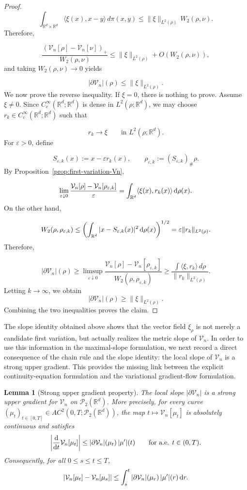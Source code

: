 \documentclass[11pt,reqno]{amsart}
\numberwithin{figure}{section}
\def\d {{\partial}}
\newcommand{\bbr}{\mathbb R}
\def\d{\mathrm{d}}
\newcommand{\dm}{d}
\renewcommand{\d}{  {\textup{d}} }
\newtheorem{lemma}{Lemma}[section]
\begin{document}
\begin{proof}
\[ \int_{\bbr^\dm\times\bbr^\dm} \langle \xi(x),x-y\rangle\,d\pi(x,y) \le \|\xi\|_{L^2(\rho)}\,W_2(\rho,\nu). \] 
Therefore, 

\[ \frac{(\mathcal V_n[\rho]-\mathcal V_n[\nu])_+}{W_2(\rho,\nu)} \le \|\xi\|_{L^2(\rho)}+O\!\left(W_2(\rho,\nu)\right), \] 
and taking $W_2(\rho,\nu)\to 0$ yields 

\[ |\partial \mathcal V_n|(\rho)\le \|\xi\|_{L^2(\rho)}. \] 
We now prove the reverse inequality. If $\xi=0$, there is nothing to prove. Assume $\xi\neq0$. Since $C_c^\infty(\mathbb R^d;\mathbb R^d)$ is dense in $L^2(\rho;\mathbb R^d)$, we may choose $r_k\in C_c^\infty(\mathbb R^d;\mathbb R^d)$ such that

\[ r_k\to \xi \qquad\text{in }L^2(\rho;\mathbb R^d). \] 
For $\varepsilon>0$, define 

\[ S_{\varepsilon,k}(x):=x-\varepsilon r_k(x), \qquad \rho_{\varepsilon,k}:=(S_{\varepsilon,k})_\#\rho. \] 
By Proposition~\ref{prop:first-variation-Vn}, 

\[ \lim_{\varepsilon\downarrow0} \frac{\mathcal V_n[\rho]-\mathcal V_n[\rho_{\varepsilon,k}]}{\varepsilon} = \int_{\mathbb R^d}\langle \xi(x),r_k(x)\rangle\,\d\rho(x). \] 
On the other hand, 

\[ W_2(\rho,\rho_{\varepsilon,k}) \le \left(\int_{\mathbb R^d}|x-S_{\varepsilon,k}(x)|^2\,\d\rho(x)\right)^{1/2} = \varepsilon \|r_k\|_{L^2(\rho)}. \] 
Therefore, 

\[ |\partial \mathcal V_n|(\rho) \ge \limsup_{\varepsilon\downarrow0} \frac{\mathcal V_n[\rho]-\mathcal V_n[\rho_{\varepsilon,k}]}{W_2(\rho,\rho_{\varepsilon,k})} \ge \frac{\int \langle \xi,r_k\rangle\,d\rho}{\|r_k\|_{L^2(\rho)}}. \] 
Letting $k\to\infty$, we obtain \[ |\partial \mathcal V_n|(\rho)\ge \|\xi\|_{L^2(\rho)}. \] 
Combining the two inequalities proves the claim. 

\end{proof} 

The slope identity obtained above shows that the vector field
$\xi_\rho$ is not merely a candidate first variation, but actually realizes
the metric slope of $\mathcal V_n$. In order to use this information in the
maximal-slope formulation, we next record a direct consequence of the chain
rule and the slope identity: the local slope of $\mathcal V_n$ is a strong
upper gradient. This provides the missing link between the explicit
continuity-equation formulation and the variational gradient-flow
formulation.

\begin{lemma}[Strong upper gradient property]
\label{lem:strong-upper-gradient-Vn}
The local slope $|\partial \mathcal V_n|$ is a strong upper gradient for
$\mathcal V_n$ on $\mathcal P_2(\mathbb R^d)$. More precisely, for every
curve $(\mu_t)_{t\in[0,T]}\in AC^2(0,T;\mathcal P_2(\mathbb R^d))$, the map
$t\mapsto \mathcal V_n[\mu_t]$ is absolutely continuous and satisfies
\[
\left|\frac{\d}{\d t}\mathcal V_n[\mu_t]\right|
\le
|\partial \mathcal V_n|(\mu_t)\,|\mu'|(t)
\qquad\text{for a.e. }t\in(0,T).
\]
Consequently, for all $0\le s\le t\le T$,
\[
|\mathcal V_n[\mu_t]-\mathcal V_n[\mu_s]|
\le
\int_s^t
|\partial \mathcal V_n|(\mu_r)\,|\mu'|(r)\,\d r .
\]
\end{lemma}
\end{document}
